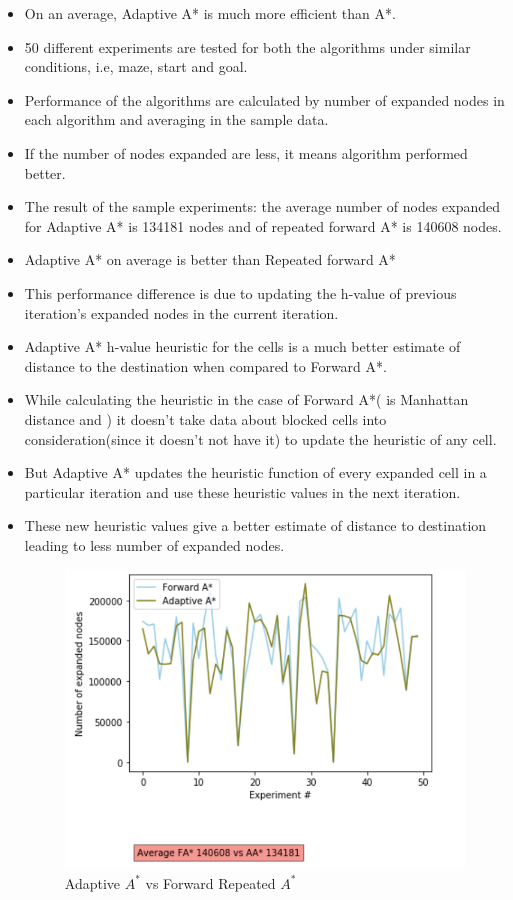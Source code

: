 \documentclass[a4 paper]{article}
\begin{document}
\begin{itemize}
    \item On an average, Adaptive A* is much more efficient than A*. 
    \item 50 different experiments are tested for both the algorithms under similar conditions, i.e, maze, start and goal. 
    \item Performance of the algorithms are calculated by number of expanded nodes in each algorithm and averaging in the sample data.
    \item If the number of nodes expanded are less, it means algorithm performed better. 
    \item The result of the sample experiments: the average number of nodes expanded for Adaptive A* is 134181 nodes and of repeated forward A* is 140608 nodes.
    \item Adaptive A* on average is better than Repeated forward A*
    \item This performance difference is due to updating the h-value of previous iteration's expanded nodes in the current iteration.
    \item Adaptive A* h-value heuristic for the cells is a much better estimate of distance to the destination when compared to Forward A*. 
    \item While calculating the heuristic in the case of Forward A*( is Manhattan distance and ) it doesn't take data about blocked cells into consideration(since it doesn't not have it) to update the heuristic of any cell. 
    \item But Adaptive A* updates the heuristic function of every expanded cell in a particular iteration and use these heuristic values in the next iteration. 
    \item These new heuristic values give a better estimate of distance to destination leading to less number of expanded nodes.

    \begin{figure}[H]
        \centering
        \includegraphics[scale=0.5]{fa vs aa.png}
        \caption{Adaptive $A^*$ vs Forward Repeated $A^*$ }
        \label{Adaptive A^* vs Forward Repeated A^*}
    \end{figure}
    
\end{itemize}
\end{document}
